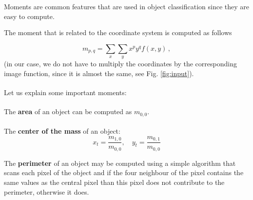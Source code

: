 \documentclass[12pt]{article}
\begin{document}
Moments are common features that are used in object classification since they are easy to compute.

The moment that is related to the coordinate system is computed as follows

\begin{equation}
m_{p, q} = \sum\limits_{x} \sum\limits_{y} x^p y^q f(x, y) \, ,
\end{equation}
(in our case, we do not have to multiply the coordinates by the corresponding image function, since it is almost the same, see Fig. \ref{fig:input}).
\\
\\
Let us explain some important moments:
\\
\\
The \textbf{area} of an object can be computed as $m_{0, 0}$.
\\
\\
The \textbf{center of the mass} of an object:
\begin{equation}
x_t = \frac{m_{1, 0}}{m_{0, 0}}, \quad y_t = \frac{m_{0, 1}}{m_{0, 0}}
\end{equation}

The \textbf{perimeter} of an object may be computed using a simple algorithm that scans each pixel of the object and if the four neighbour of the pixel
contains the same values as the central pixel than this pixel does not contribute to the perimeter, otherwise it does.
\end{document}
